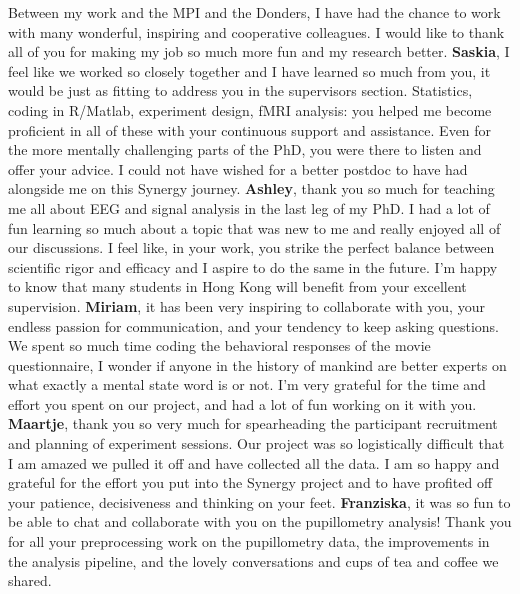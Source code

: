 Between my work and the MPI and the Donders, I have had the chance to work with many wonderful, inspiring and cooperative colleagues. I would like to thank all of you for making my job so much more fun and my research better. \newline
\textbf{Saskia}, I feel like we worked so closely together and I have learned so much from you, it would be just as fitting to address you in the supervisors section. Statistics, coding in R/Matlab, experiment design, fMRI analysis: you helped me become proficient in all of these with your continuous support and assistance. Even for the more mentally challenging parts of the PhD, you were there to listen and offer your advice. I could not have wished for a better postdoc to have had alongside me on this Synergy journey. \newline
\textbf{Ashley}, thank you so much for teaching me all about EEG and signal analysis in the last leg of my PhD. I had a lot of fun learning so much about a topic that was new to me and really enjoyed all of our discussions. I feel like, in your work, you strike the perfect balance between scientific rigor and efficacy and I aspire to do the same in the future. I'm happy to know that many students in Hong Kong will benefit from your excellent supervision. \newline
\textbf{Miriam}, it has been very inspiring to collaborate with you, your endless passion for communication, and your tendency to keep asking questions. We spent so much time coding the behavioral responses of the movie questionnaire, I wonder if anyone in the history of mankind are better experts on what exactly a mental state word is or not. I'm very grateful for the time and effort you spent on our project, and had a lot of fun working on it with you. \newline
\textbf{Maartje}, thank you so very much for spearheading the participant recruitment and planning of experiment sessions. Our project was so logistically difficult that I am amazed we pulled it off and have collected all the data. I am so happy and grateful for the effort you put into the Synergy project and to have profited off your patience, decisiveness and thinking on your feet. \newline
\textbf{Franziska}, it was so fun to be able to chat and collaborate with you on the pupillometry analysis! Thank you for all your preprocessing work on the pupillometry data, the improvements in the analysis pipeline, and the lovely conversations and cups of tea and coffee we shared. \newline
